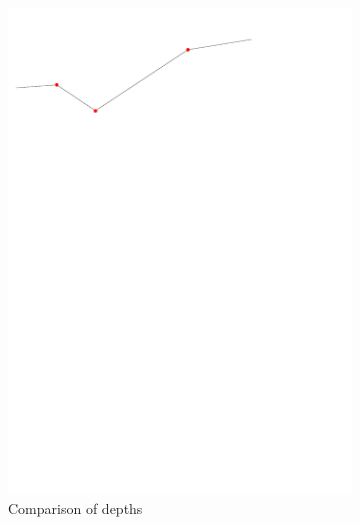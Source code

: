 \begin{figure}[tbh]
\begin{subfigure}[b]{0.45\linewidth}
    \includegraphics[width=\textwidth,page=3]{figs/1Dsmoothop.pdf}
    \caption{Comparison of depths}\label{fig:1Dsmoothop:c}
  \end{subfigure}
  \quad
  \begin{subfigure}[b]{0.45\linewidth}
    \centering

\end{subfigure}
\end{figure}
